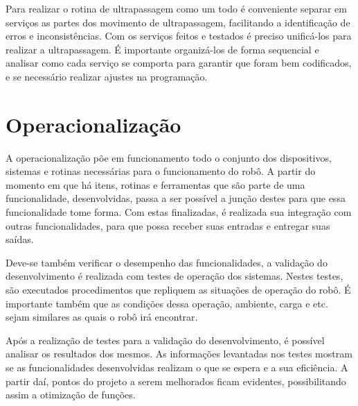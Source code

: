 Para realizar o rotina de ultrapassagem como um todo é conveniente separar em serviços as partes dos movimento de ultrapassagem, facilitando a identificação de erros e inconsistências. Com os serviços feitos e testados é preciso unificá-los para realizar a ultrapassagem. É importante organizá-los de forma sequencial e analisar como cada serviço se comporta para garantir que foram bem codificados, e se necessário realizar ajustes na programação. 

\section{Operacionalização}
\label{sec:operal}
A operacionalização põe em funcionamento todo o conjunto dos dispositivos, sistemas e rotinas necessárias para o funcionamento do robô. A partir do momento em que há itens, rotinas e ferramentas que são parte de uma funcionalidade, desenvolvidas, passa a ser possível a junção destes para que essa funcionalidade tome forma. Com estas finalizadas, é realizada sua integração com outras funcionalidades, para que possa receber suas entradas e entregar suas saídas.

Deve-se também verificar o desempenho das funcionalidades, a validação do desenvolvimento é realizada com testes de operação dos sistemas. Nestes testes, são executados procedimentos que repliquem as situações de operação do robô. É importante também que as condições dessa operação, ambiente, carga e etc. sejam similares as quais o robô irá encontrar.

Após a realização de testes para a validação do desenvolvimento, é possível analisar os resultados dos mesmos. As informações levantadas nos testes mostram se as funcionalidades desenvolvidas realizam o que se espera e a sua eficiência. A partir daí, pontos do projeto a serem melhorados ficam evidentes, possibilitando assim a otimização de funções.
